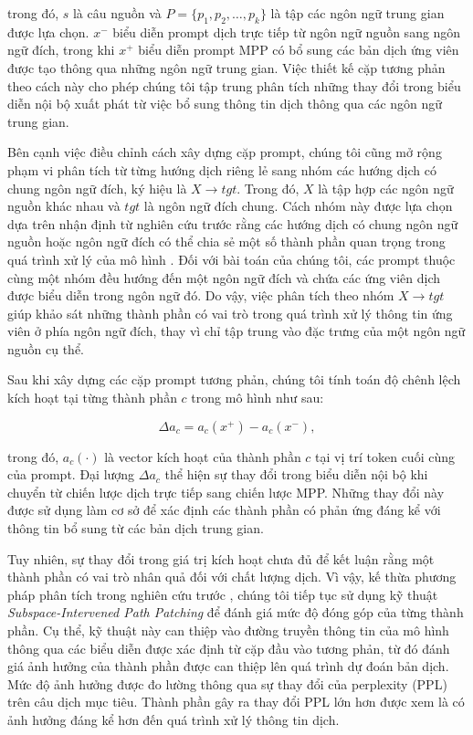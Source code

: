 trong đó, $s$ là câu nguồn và $P = \{p_1, p_2, \ldots, p_k\}$ là tập các ngôn ngữ trung gian được lựa chọn. $x^-$ biểu diễn prompt dịch trực tiếp từ ngôn ngữ nguồn sang ngôn ngữ đích, trong khi $x^+$ biểu diễn prompt MPP có bổ sung các bản dịch ứng viên được tạo thông qua những ngôn ngữ trung gian. Việc thiết kế cặp tương phản theo cách này cho phép chúng tôi tập trung phân tích những thay đổi trong biểu diễn nội bộ xuất phát từ việc bổ sung thông tin dịch thông qua các ngôn ngữ trung gian.

Bên cạnh việc điều chỉnh cách xây dựng cặp prompt, chúng tôi cũng mở rộng phạm vi phân tích từ từng hướng dịch riêng lẻ sang nhóm các hướng dịch có chung ngôn ngữ đích, ký hiệu là $X \rightarrow tgt$. Trong đó, $X$ là tập hợp các ngôn ngữ nguồn khác nhau và $tgt$ là ngôn ngữ đích chung. Cách nhóm này được lựa chọn dựa trên nhận định từ nghiên cứu trước rằng các hướng dịch có chung ngôn ngữ nguồn hoặc ngôn ngữ đích có thể chia sẻ một số thành phần quan trọng trong quá trình xử lý của mô hình \cite{zhang2026exploring}. Đối với bài toán của chúng tôi, các prompt thuộc cùng một nhóm đều hướng đến một ngôn ngữ đích và chứa các ứng viên dịch được biểu diễn trong ngôn ngữ đó. Do vậy, việc phân tích theo nhóm $X \rightarrow tgt$ giúp khảo sát những thành phần có vai trò trong quá trình xử lý thông tin ứng viên ở phía ngôn ngữ đích, thay vì chỉ tập trung vào đặc trưng của một ngôn ngữ nguồn cụ thể.

Sau khi xây dựng các cặp prompt tương phản, chúng tôi tính toán độ chênh lệch kích hoạt tại từng thành phần $c$ trong mô hình như sau:

\begin{equation}
	\Delta a_c = a_c(x^+) - a_c(x^-),
\end{equation}

trong đó, $a_c(\cdot)$ là vector kích hoạt của thành phần $c$ tại vị trí token cuối cùng của prompt. Đại lượng $\Delta a_c$ thể hiện sự thay đổi trong biểu diễn nội bộ khi chuyển từ chiến lược dịch trực tiếp sang chiến lược MPP. Những thay đổi này được sử dụng làm cơ sở để xác định các thành phần có phản ứng đáng kể với thông tin bổ sung từ các bản dịch trung gian.

Tuy nhiên, sự thay đổi trong giá trị kích hoạt chưa đủ để kết luận rằng một thành phần có vai trò nhân quả đối với chất lượng dịch. Vì vậy, kế thừa phương pháp phân tích trong nghiên cứu trước \cite{zhang2026exploring}, chúng tôi tiếp tục sử dụng kỹ thuật \textit{Subspace-Intervened Path Patching} để đánh giá mức độ đóng góp của từng thành phần. Cụ thể, kỹ thuật này can thiệp vào đường truyền thông tin của mô hình thông qua các biểu diễn được xác định từ cặp đầu vào tương phản, từ đó đánh giá ảnh hưởng của thành phần được can thiệp lên quá trình dự đoán bản dịch. Mức độ ảnh hưởng được đo lường thông qua sự thay đổi của perplexity (PPL) trên câu dịch mục tiêu. Thành phần gây ra thay đổi PPL lớn hơn được xem là có ảnh hưởng đáng kể hơn đến quá trình xử lý thông tin dịch.

